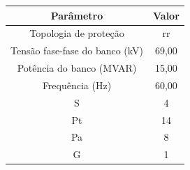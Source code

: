 \begin{tabular}{cc}
\hline
Parâmetro & Valor \\
\hline
Topologia de proteção & rr \\
Tensão fase-fase do banco (kV) & 69,00 \\
Potência do banco (MVAR) & 15,00 \\
Frequência (Hz) & 60,00 \\
S & 4 \\
Pt & 14 \\
Pa & 8 \\
G & 1 \\
\hline
\end{tabular}